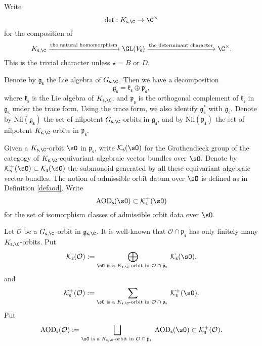 \documentclass[12pt,a4paper]{amsart}
\newcommand{\CK}{{\mathcal {K}}}
\newcommand{\CO}{{\mathcal {O}}}
\newcommand{\g}{\mathfrak g}
\newcommand{\p}{\mathfrak p}
\newcommand{\be}{\begin {equation}}
\newcommand{\ee}{\end {equation}}
\numberwithin{equation}{section}
\theoremstyle{remark}
\begin{document}
Write
\[
{\det} : K_{\mathsf s, \C}\rightarrow \C^\times
\]
for the composition of
\be\label{comdet}
   K_{\mathsf s, \C}\xrightarrow{\textrm{the natural homomorphism}} \GL(V_{\mathsf s})\xrightarrow{\textrm{the determinant character}}\C^\times.
\ee
This is the trivial character unless $\star=B$ or $D$.


Denote by $\g_\mathsf s$ the Lie algebra of $G_{\mathsf s, \C}$. Then we have a decomposition
\[
\g_\mathsf s=\mathfrak k_\mathsf s \oplus \p_\mathsf s,
\]
where $\mathfrak k_\mathsf s$ is the Lie algebra of $K_{\mathsf s, \C}$, and $\p_\mathsf s$ is the orthogonal complement of $\mathfrak k_\mathsf s$ in $\g_\mathsf s$ under the trace form.
Using the trace form, we also identify $\g_{\mathsf s}^*$ with $\g_\mathsf s$. Denote by $\mathrm{Nil}(\g_\mathsf s)$ the set of nilpotent $G_{\mathsf s, \C}$-orbits in $\g_\mathsf s$, and by
$\mathrm{Nil}(\p_\mathsf s)$ the set of nilpotent $K_{\mathsf s, \C}$-orbits in $\p_\mathsf s$.

Given a $K_{\mathsf s,\C}$-orbit $\sO$ in $\p_\mathsf s$, write $\CK_{\mathsf s}(\sO)$ for the Grothendieck group of the categogy of
$K_{\mathsf s,\C}$-equivariant algebraic vector bundles  over $\sO$. Denote by $\CK^+_{\mathsf s}(\sO)\subset \CK_{\mathsf s}(\sO)$ the submonoid generated by all these equivariant algebraic vector bundles. The notion of admissible orbit datum over $\sO$ is defined as in Definition \ref{defaod}. Write
\[
\mathrm{AOD}_\mathsf s(\sO)\subset \CK^+_{\mathsf s}(\sO)
\]
for the set of isomorphism classes of admissible orbit data over $\sO$.

Let $\CO$ be a $G_{\mathsf s,\C}$-orbit in $\g_{\mathsf s,\C}$. It is well-known that $\CO\cap \p_{\mathsf s}$ has only finitely many $K_{\mathsf s,\C}$-orbits. Put
\[
\CK_{\mathsf s}(\CO):=\bigoplus_{\sO\textrm{ is a $K_{\mathsf s,\C}$-orbit in $\CO\cap \p_{\mathsf s}$ }}\CK_{\mathsf s}(\sO),
\]
and
\[
\CK_{\mathsf s}^+(\CO):=\sum_{\sO\textrm{ is a $K_{\mathsf s,\C}$-orbit in $\CO\cap \p_{\mathsf s}$ }}\CK^+_{\mathsf s}(\sO).
\]
Put
\[
\mathrm{AOD}_\mathsf s(\CO):=\bigsqcup_{\sO\textrm{ is a $K_{\mathsf s,\C}$-orbit in $\CO\cap \p_{\mathsf s}$ }}\mathrm{AOD}_\mathsf s(\sO)\subset \CK^+_{\mathsf s}(\CO).
\]
\end{document}
